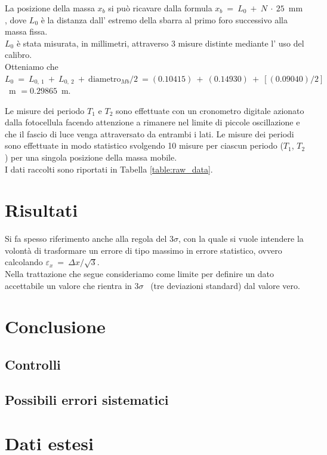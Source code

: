 \documentclass[italian, a4paper, 10pt, twocolumn]{../../style/lab_unige}
\newcommand{\reftab}[1]{Tabella {\ref{#1}}}%
\newcommand{\treSigma}{$3\sigma$}
\newcommand{\mstdErr}[1]{\varepsilon_{#1}}
\newcommand{\Ti}[1]{$T_{#1}$}
\begin{document}
    La posizione della massa $x_b$ si può ricavare dalla formula $x_b~=~L_0~+~N~\cdot~25$~mm , dove $L_0$ è la distanza dall’ estremo della sbarra al primo foro successivo alla massa fissa.\\
    $L_0$ è stata misurata, in millimetri, attraverso 3 misure distinte mediante l’ uso del calibro. \\
    Otteniamo che $L_0~=~L_{0,~1}~+~L_{0,~2}~+~\text{diametro}_{Mb}/2~= (0.10415)~+~(0.14930)~+~[(0.09040)/2]$~m $ = 0.29865$~m.

    Le misure dei periodo \Ti{1} e \Ti{2} sono effettuate con un cronometro digitale azionato dalla fotocellula facendo attenzione a rimanere nel limite di piccole oscillazione e che il fascio di luce venga attraversato da entrambi i lati.
    Le misure dei periodi sono effettuate in modo statistico svolgendo 10 misure per ciascun periodo (\Ti{1}, \Ti{2}) per una singola posizione della massa mobile.\\
    I dati raccolti sono riportati in \reftab{table:raw_data}.



    \section{Risultati}
    \label{section:results}
    Si fa spesso riferimento anche alla regola del \treSigma, con la quale si vuole intendere la volontà di trasformare un errore di tipo massimo in errore statistico, ovvero calcolando $\mstdErr{x}~=~\Delta x/\sqrt{3}$.\\%
    Nella trattazione che segue consideriamo come limite per definire un dato accettabile un valore che rientra in \treSigma~ (tre deviazioni standard) dal valore vero.

    
    \section{Conclusione}
    \label{section:conclusion}

    \subsection{Controlli}

    \subsection{Possibili errori sistematici}

    \appendix

    \setcounter{table}{0}
    \renewcommand{\thetable}{A\arabic{table}}

    \section{Dati estesi}
    
    
\end{document}
